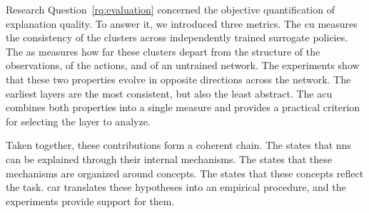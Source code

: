 Research Question~\ref{rq:evaluation} concerned the objective quantification of explanation quality.
To answer it, we introduced three metrics.
The \gls{cu} measures the consistency of the clusters across independently trained surrogate policies.
The \gls{as} measures how far these clusters depart from the structure of the observations, of the actions, and of an untrained network.
The experiments show that these two properties evolve in opposite directions across the network.
The earliest layers are the most consistent, but also the least abstract.
The \gls{acu} combines both properties into a single measure and provides a practical criterion for selecting the layer to analyze.

Taken together, these contributions form a coherent chain.
The \MechanisticHypothesisName states that \glspl{nn} can be explained through their internal mechanisms.
The \ConceptHypothesisName states that these mechanisms are organized around concepts.
The \RepresentationConvergenceHypothesisName states that these concepts reflect the task.
\gls{car} translates these hypotheses into an empirical procedure, and the experiments provide support for them.
